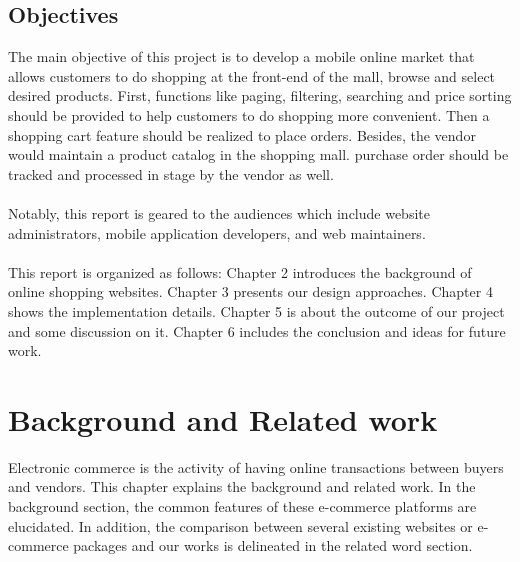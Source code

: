 \documentclass{article}
\begin{document}
\subsection{Objectives}
The main objective of this project is to develop a mobile online market that allows customers to do shopping at the front-end of the mall, browse and select desired products. First, functions like paging, filtering, searching and price sorting should be provided to help customers to do shopping more convenient. Then a shopping cart feature should be realized to place orders. Besides, the vendor would maintain a product catalog in the shopping mall. purchase order should be tracked and processed in stage by the vendor as well. 
\\\\
Notably, this report is geared to the audiences which include website administrators, mobile application developers, and web maintainers. 
\\\\
This report is organized as follows: Chapter 2 introduces the background of online shopping websites. Chapter 3 presents our design approaches. Chapter 4 shows the implementation details. Chapter 5 is about the outcome of our project and some discussion on it. Chapter 6 includes the conclusion and ideas for future work.

\section{Background and Related work}

Electronic commerce is the activity of having online transactions between buyers and vendors. This chapter explains the background and related work. In the background section, the common features of these e-commerce platforms are elucidated. In addition, the comparison between several existing websites or e-commerce packages and our works is delineated in the related word section.
\end{document}
